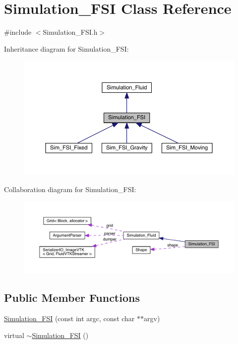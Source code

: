 \hypertarget{class_simulation___f_s_i}{}\section{Simulation\+\_\+\+F\+S\+I Class Reference}
\label{class_simulation___f_s_i}


{\ttfamily \#include $<$Simulation\+\_\+\+F\+S\+I.\+h$>$}



Inheritance diagram for Simulation\+\_\+\+F\+S\+I\+:
\nopagebreak
\begin{figure}[H]
\begin{center}
\leavevmode
\includegraphics[width=350pt]{dc/dbf/class_simulation___f_s_i__inherit__graph}
\end{center}
\end{figure}


Collaboration diagram for Simulation\+\_\+\+F\+S\+I\+:
\nopagebreak
\begin{figure}[H]
\begin{center}
\leavevmode
\includegraphics[width=350pt]{d4/d0c/class_simulation___f_s_i__coll__graph}
\end{center}
\end{figure}
\subsection*{Public Member Functions}
\begin{DoxyCompactItemize}
\item 
\hyperlink{class_simulation___f_s_i_aab0996b147031f932457952dc69bfc6e}{Simulation\+\_\+\+F\+S\+I} (const int argc, const char $\ast$$\ast$argv)
\item 
virtual \hyperlink{class_simulation___f_s_i_ae9af86a8d512795b3c634fa10b72beca}{$\sim$\+Simulation\+\_\+\+F\+S\+I} ()
\end{DoxyCompactItemize}
